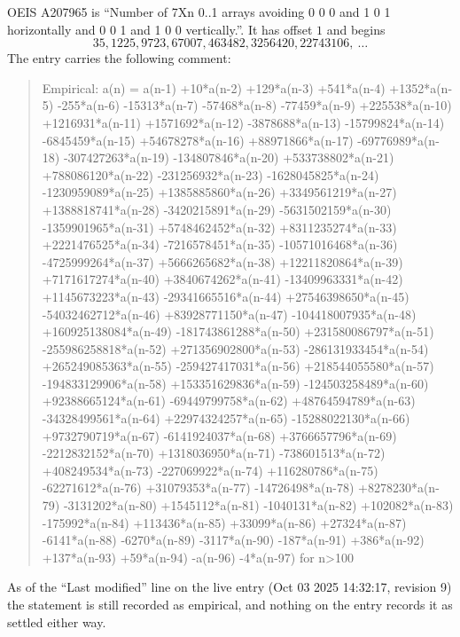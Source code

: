 \documentclass[11pt,a4paper]{article}
\theoremstyle{plain}
\theoremstyle{definition}
\begin{document}
OEIS A207965 is ``Number of 7Xn 0..1 arrays avoiding 0 0 0 and 1 0 1 horizontally and 0 0 1 and 1 0 0 vertically.''. It has offset
$1$ and begins
\[
35, 1225, 9723, 67007, 463482, 3256420, 22743106,\ \dots
\]
The entry carries the following comment:
\begin{quote}\small
Empirical: a(n) = a(n-1) +10*a(n-2) +129*a(n-3) +541*a(n-4) +1352*a(n-5) -255*a(n-6) -15313*a(n-7) -57468*a(n-8) -77459*a(n-9) +225538*a(n-10) +1216931*a(n-11) +1571692*a(n-12) -3878688*a(n-13) -15799824*a(n-14) -6845459*a(n-15) +54678278*a(n-16) +88971866*a(n-17) -69776989*a(n-18) -307427263*a(n-19) -134807846*a(n-20) +533738802*a(n-21) +788086120*a(n-22) -231256932*a(n-23) -1628045825*a(n-24) -1230959089*a(n-25) +1385885860*a(n-26) +3349561219*a(n-27) +1388818741*a(n-28) -3420215891*a(n-29) -5631502159*a(n-30) -1359901965*a(n-31) +5748462452*a(n-32) +8311235274*a(n-33) +2221476525*a(n-34) -7216578451*a(n-35) -10571016468*a(n-36) -4725999264*a(n-37) +5666265682*a(n-38) +12211820864*a(n-39) +7171617274*a(n-40) +3840674262*a(n-41) -13409963331*a(n-42) +1145673223*a(n-43) -29341665516*a(n-44) +27546398650*a(n-45) -54032462712*a(n-46) +83928771150*a(n-47) -104418007935*a(n-48) +160925138084*a(n-49) -181743861288*a(n-50) +231580086797*a(n-51) -255986258818*a(n-52) +271356902800*a(n-53) -286131933454*a(n-54) +265249085363*a(n-55) -259427417031*a(n-56) +218544055580*a(n-57) -194833129906*a(n-58) +153351629836*a(n-59) -124503258489*a(n-60) +92388665124*a(n-61) -69449799758*a(n-62) +48764594789*a(n-63) -34328499561*a(n-64) +22974324257*a(n-65) -15288022130*a(n-66) +9732790719*a(n-67) -6141924037*a(n-68) +3766657796*a(n-69) -2212832152*a(n-70) +1318036950*a(n-71) -738601513*a(n-72) +408249534*a(n-73) -227069922*a(n-74) +116280786*a(n-75) -62271612*a(n-76) +31079353*a(n-77) -14726498*a(n-78) +8278230*a(n-79) -3131202*a(n-80) +1545112*a(n-81) -1040131*a(n-82) +102082*a(n-83) -175992*a(n-84) +113436*a(n-85) +33099*a(n-86) +27324*a(n-87) -6141*a(n-88) -6270*a(n-89) -3117*a(n-90) -187*a(n-91) +386*a(n-92) +137*a(n-93) +59*a(n-94) -a(n-96) -4*a(n-97) for n>100
\end{quote}
As of the ``Last modified'' line on the live entry (Oct 03 2025 14:32:17, revision
9) the statement is still recorded as empirical, and nothing on the entry
records it as settled either way.
\end{document}
